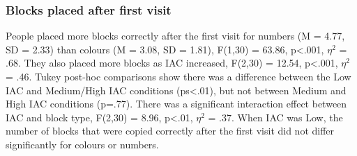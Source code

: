 \subsubsection{Blocks placed after first visit}
People placed more blocks correctly after the first visit for numbers (M = 4.77, SD = 2.33) than colours (M = 3.08, SD = 1.81), F(1,30) = 63.86, p<.001, $\eta^2$  = .68. They also placed more blocks as IAC increased, F(2,30) = 12.54, p<.001, $\eta^2$  = .46. Tukey post-hoc comparisons show there was a difference between the Low IAC and Medium/High IAC conditions (ps<.01), but not between Medium and High IAC conditions (p=.77). There was a significant interaction effect between IAC and block type, F(2,30) = 8.96, p<.01, $\eta^2$  = .37. When IAC was Low, the number of blocks that were copied correctly after the first visit did not differ significantly for colours or numbers.

